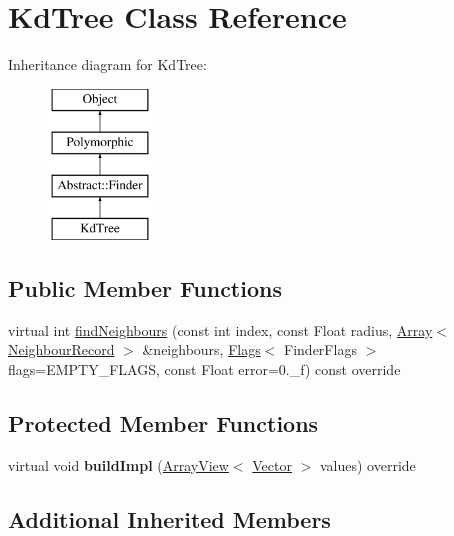 \hypertarget{classKdTree}{}\section{Kd\+Tree Class Reference}
\label{classKdTree}
Inheritance diagram for Kd\+Tree\+:\begin{figure}[H]
\begin{center}
\leavevmode
\includegraphics[height=4.000000cm]{classKdTree}
\end{center}
\end{figure}
\subsection*{Public Member Functions}
\begin{DoxyCompactItemize}
\item 
virtual int \hyperlink{classKdTree_a830840ce00b519f37e922a69733b68c1}{find\+Neighbours} (const int index, const Float radius, \hyperlink{classArray}{Array}$<$ \hyperlink{structNeighbourRecord}{Neighbour\+Record} $>$ \&neighbours, \hyperlink{classFlags}{Flags}$<$ Finder\+Flags $>$ flags=E\+M\+P\+T\+Y\+\_\+\+F\+L\+A\+GS, const Float error=0.\+\_\+f) const override
\end{DoxyCompactItemize}
\subsection*{Protected Member Functions}
\begin{DoxyCompactItemize}
\item 
\hypertarget{classKdTree_a2acc49e7949a6c0c2ba58a99cf2a1f63}{}\label{classKdTree_a2acc49e7949a6c0c2ba58a99cf2a1f63} 
virtual void {\bfseries build\+Impl} (\hyperlink{classArrayView}{Array\+View}$<$ \hyperlink{classBasicVector}{Vector} $>$ values) override
\end{DoxyCompactItemize}
\subsection*{Additional Inherited Members}


